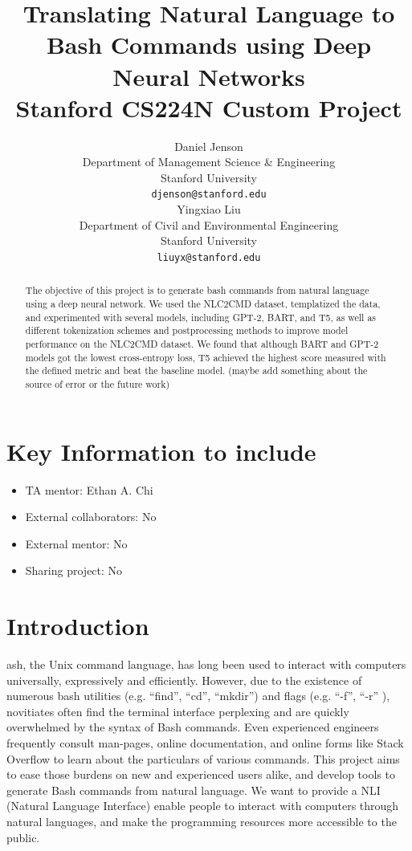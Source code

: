 \documentclass{article}
\title{
  Translating Natural Language to Bash Commands using Deep Neural Networks \\
  \vspace{1em}
  \small{\normalfont Stanford CS224N Custom Project}
}
\author{
 Daniel Jenson \\
  Department of Management Science \& Engineering \\
  Stanford University \\
  \texttt{djenson@stanford.edu} \\
  \And
  Yingxiao Liu \\
  Department of Civil and Environmental Engineering \\
  Stanford University \\
  \texttt{liuyx@stanford.edu} \\
}
\begin{document}
\maketitle

\begin{abstract}
The objective of this project is to generate bash commands from natural language using a deep neural network. We used the NLC2CMD dataset, templatized the data, and experimented with several models, including GPT-2, BART, and T5, as well as different tokenization schemes and postprocessing methods to improve model performance on the NLC2CMD dataset. We found that although BART and GPT-2 models got the lowest cross-entropy loss, T5 achieved the highest score measured with the defined metric and beat the baseline model. (maybe add something about the source of error or the future work)
\end{abstract}


\section{Key Information to include}
\begin{itemize}
	\item TA mentor: Ethan A. Chi
	\item External collaborators: No
	\item External mentor: No
	\item Sharing project: No
\end{itemize}


\section{Introduction}
ash, the Unix command language, has long been used to interact with computers universally, expressively and efficiently.  However, due to the existence of numerous bash utilities (e.g. ``find'', ``cd'', ``mkdir'') and flags (e.g. ``-f'', ``-r'' ), novitiates often find the terminal interface perplexing and are quickly overwhelmed by the syntax of Bash commands. Even experienced engineers frequently consult man-pages, online documentation, and online forms like Stack Overflow to learn about the particulars of various commands. This project aims to ease those burdens on new and experienced users alike, and develop tools to generate Bash commands from natural language. We want to provide a NLI (Natural Language Interface) enable people to interact with computers through natural languages, and make the programming resources more accessible to the public.
\end{document}
